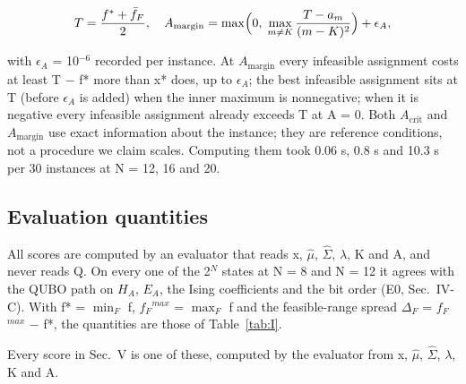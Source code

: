 \documentclass[journal]{IEEEtran}
\begin{document}
\begin{equation*}
T = \frac{f^{*} + \bar{f}_F}{2},\quad A_{\mathrm{margin}} = \max\Bigl(0,\; \max_{m \neq K} \frac{T - a_m}{(m-K)^2}\Bigr) + \epsilon_A,
\end{equation*}


with $\epsilon_{A}$ = 10$^{-6}$ recorded per instance. At $A_{\mathrm{margin}}$ every infeasible assignment costs at least T $-$ f* more than x* does, up to $\epsilon_{A}$; the best infeasible assignment sits at T (before $\epsilon_{A}$ is added) when the inner maximum is nonnegative; when it is negative every infeasible assignment already exceeds T at A = 0. Both $A_{\mathrm{crit}}$ and $A_{\mathrm{margin}}$ use exact information about the instance; they are reference conditions, not a procedure we claim scales. Computing them took 0.06 s, 0.8 s and 10.3 s per 30 instances at N = 12, 16 and 20.


\subsection{Evaluation quantities}


All scores are computed by an evaluator that reads x, $\hat{\mu}$, $\hat{\Sigma}$, $\lambda$, K and A, and never reads Q. On every one of the 2$^{N}$ states at N = 8 and N = 12 it agrees with the QUBO path on $H_{A}$, $E_{A}$, the Ising coefficients and the bit order (E0, Sec.~IV-C). With f* = $\min_{F}$ f, $f_{F}$$^{max}$ = $\max_{F}$ f and the feasible-range spread $\Delta_{F}$ = $f_{F}$$^{max}$ $-$ f*, the quantities are those of Table~\ref{tab:I}.


Every score in Sec.~V is one of these, computed by the evaluator from x, $\hat{\mu}$, $\hat{\Sigma}$, $\lambda$, K and A.
\end{document}
